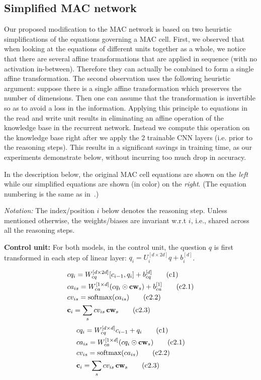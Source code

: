 \subsection{Simplified MAC network}
Our proposed modification to the MAC network is based on two heuristic
simplifications of the equations governing a MAC cell. 
First, we observed that when looking at the equations of different units
together as a whole, we notice that there are several affine transformations
that are applied in sequence (with no activation in-between).
Therefore they can actually be combined to form a single affine transformation.
The second observation uses the following heuristic argument:
suppose there is a single affine transformation which preserves the number
of dimensions. Then one can assume that the transformation is invertible
so as to avoid a loss in the information. Applying this principle to 
equations in the read and write unit results in eliminating an affine
operation of the knowledge base in the recurrent network. Instead we compute
this operation on the knowledge base right after we apply the 2 
trainable CNN layers (i.e. prior to the reasoning steps). This results
in a significant savings in training time, as our experiments demonstrate
below, without incurring too much drop in accuracy.

In the description below, the original MAC cell equations are shown on the \emph{left}
while our simplified equations are shown (in color) on the {\color{Plum} \emph{right}}.
(The equation numbering is the same as in~\cite{hudson2018compositional}.)

\noindent\textit{Notation:} The index/position $i$ below denotes the reasoning step. 
Unless mentioned otherwise, the weights/biases are invariant w.r.t $i$, 
i.e., shared across all the reasoning steps. 

\noindent\textbf{Control unit:} 
For both models, in the control unit, the question $q$ is first transformed in each step of 
linear layer: $q_i = U_i^{[d \times 2d]} q + b_i^{[d]}$.

\begin{multicols}{2}
	\noindent
	\begin{align*}
	&cq_i = W_{cq}^{[d \times 2d]} [c_{i-1}, q_i] + b_{cq}^{[d]}  \tag{c1} \\
	&ca_{is} = W_{ca}^{[1 \times d]} (cq_i \odot \mathbf{cw}_s) + b_{ca}^{[1]}
	\tag{c2.1}\\
	&cv_{is} = \textrm{softmax}(ca_{is}) \tag{c2.2}\\
	&\mathbf{c}_i = \sum_s cv_{is} \, \mathbf{cw}_s  \tag{c2.3}
	\end{align*}
	\columnbreak
	{\color{Plum}
	\begin{align*}
	&cq_i = W_{cq}^{[d \times d]} c_{i-1} + q_i  \tag{c1} \\
	&ca_{is} = W_{ca}^{[1 \times d]} (cq_i \odot \mathbf{cw}_s)  \tag{c2.1}\\
	&cv_{is} = \textrm{softmax}(ca_{is}) \tag{c2.2}\\
	&\mathbf{c}_i = \sum_s cv_{is} \, \mathbf{cw}_s  \tag{c2.3}
    \end{align*}}
\end{multicols}

